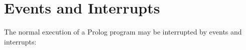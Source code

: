 %
%
%
%
%
%
%
%

\chapter{Events and Interrupts}
\label{chapexcept}

The normal execution of a Prolog program may be interrupted by
events and interrupts:

